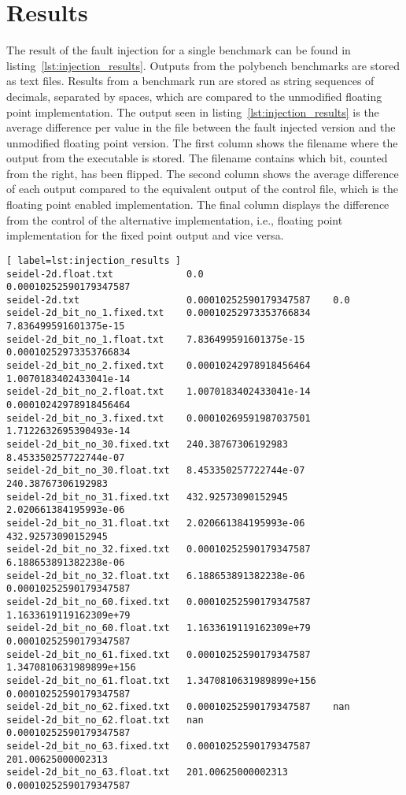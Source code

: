 \section{Results}




The result of the fault injection for a single benchmark can be found in listing~\ref{lst:injection_results}. Outputs from the polybench benchmarks are stored as text files. Results from a benchmark run are stored as string sequences of decimals, separated by spaces, which are compared to the unmodified floating point implementation. The output seen in listing~\ref{lst:injection_results} is the average difference per value in the file between the fault injected version and the unmodified floating point version.  
The first column shows the filename where the output from the executable is stored. The filename contains which bit, counted from the right, has been flipped. The second column shows the average difference of each output compared to the equivalent output of the control file, which is the floating point enabled implementation. The final column displays the difference from the control of the alternative implementation, i.e., floating point implementation for the fixed point output and vice versa.

\begin{verbatim}[ label=lst:injection_results ]
seidel-2d.float.txt             0.0                       0.00010252590179347587
seidel-2d.txt                   0.00010252590179347587    0.0
seidel-2d_bit_no_1.fixed.txt    0.00010252973353766834    7.836499591601375e-15
seidel-2d_bit_no_1.float.txt    7.836499591601375e-15     0.00010252973353766834
seidel-2d_bit_no_2.fixed.txt    0.00010242978918456464    1.0070183402433041e-14
seidel-2d_bit_no_2.float.txt    1.0070183402433041e-14    0.00010242978918456464
seidel-2d_bit_no_3.fixed.txt    0.00010269591987037501    1.7122632695390493e-14
seidel-2d_bit_no_30.fixed.txt   240.38767306192983        8.453350257722744e-07
seidel-2d_bit_no_30.float.txt   8.453350257722744e-07     240.38767306192983
seidel-2d_bit_no_31.fixed.txt   432.92573090152945        2.020661384195993e-06
seidel-2d_bit_no_31.float.txt   2.020661384195993e-06     432.92573090152945
seidel-2d_bit_no_32.fixed.txt   0.00010252590179347587    6.188653891382238e-06
seidel-2d_bit_no_32.float.txt   6.188653891382238e-06     0.00010252590179347587
seidel-2d_bit_no_60.fixed.txt   0.00010252590179347587    1.1633619119162309e+79
seidel-2d_bit_no_60.float.txt   1.1633619119162309e+79    0.00010252590179347587
seidel-2d_bit_no_61.fixed.txt   0.00010252590179347587    1.3470810631989899e+156
seidel-2d_bit_no_61.float.txt   1.3470810631989899e+156   0.00010252590179347587
seidel-2d_bit_no_62.fixed.txt   0.00010252590179347587    nan
seidel-2d_bit_no_62.float.txt   nan                       0.00010252590179347587
seidel-2d_bit_no_63.fixed.txt   0.00010252590179347587    201.00625000002313
seidel-2d_bit_no_63.float.txt   201.00625000002313        0.00010252590179347587
\end{verbatim}



